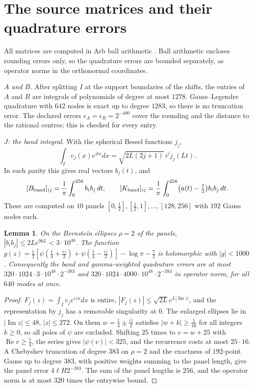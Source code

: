 \documentclass[11pt]{amsart}
\newtheorem{lemma}[proposition]{Lemma}
\theoremstyle{remark}
\numberwithin{equation}{section}
\begin{document}
\section{The source matrices and their quadrature errors}\label{sec:sources}

All matrices are computed in Arb ball arithmetic \cite{Arb}. Ball arithmetic encloses rounding errors only, so the quadrature errors are bounded separately, as operator norms in the orthonormal coordinates.

\emph{$A$ and $B$.} After splitting $I$ at the support boundaries of the shifts, the entries of $A$ and $B$ are integrals of polynomials of degree at most $1278$. Gauss--Legendre quadrature with $642$ nodes is exact up to degree $1283$, so there is no truncation error. The declared errors $\epsilon_A=\epsilon_B=2^{-400}$ cover the rounding and the distance to the rational centres; this is checked for every entry.

\emph{$J$: the band integral.} With the spherical Bessel functions $j_j$,
\[
\int_Iv_j(x)e^{itx}dx=\sqrt{2L(2j+1)}\,i^jj_j(Lt).
\]
In each parity this gives real vectors $b_j(t)$, and
\[
[B_{\rm band}]_{ij}=\frac1\pi\int_0^{256}b_ib_j\,dt,\qquad[K_{\rm band}]_{ij}=\frac1\pi\int_0^{256}\bigl(a(t)-\tfrac72\bigr)b_ib_j\,dt .
\]
These are computed on $10$ panels $[0,\frac12],[\frac12,1],\dots,[128,256]$ with $192$ Gauss nodes each.

\begin{lemma}\label{lem:quad}
On the Bernstein ellipses $\rho=2$ of the panels, $|b_ib_j|\le2Le^{96L}<3\cdot10^{48}$. The function $g(z)=\frac12[\psi(\frac14+\frac{iz}2)+\psi(\frac14-\frac{iz}2)]-\log\pi-\frac72$ is holomorphic with $|g|<1000$. Consequently the band and gamma-weighted quadrature errors are at most $320\cdot1024\cdot3\cdot10^{48}\cdot2^{-383}$ and $320\cdot1024\cdot4000\cdot10^{48}\cdot2^{-383}$ in operator norm, for all $640$ modes at once.
\end{lemma}
\begin{proof}
$F_j(z)=\int_Iv_je^{izx}dx$ is entire, $|F_j(z)|\le\sqrt{2L}e^{L|\operatorname{Im}z|}$, and the representation by $j_j$ has a removable singularity at $0$. The enlarged ellipses lie in $|\operatorname{Im}z|\le48$, $|z|\le272$. On them $w=\frac14\pm\frac{iz}2$ satisfies $|w+k|\ge\frac1{16}$ for all integers $k\ge0$, so all poles of $\psi$ are excluded. Shifting $25$ times to $v=w+25$ with $\operatorname{Re}v\ge\frac54$, the series \cite[5.7.6]{DLMF} gives $|\psi(v)|<325$, and the recurrence costs at most $25\cdot16$. A Chebyshev truncation of degree $383$ on $\rho=2$ and the exactness of $192$-point Gauss up to degree $383$, with positive weights summing to the panel length, give the panel error $4\ell H2^{-383}$. The sum of the panel lengths is $256$, and the operator norm is at most $320$ times the entrywise bound.
\end{proof}
\end{document}
